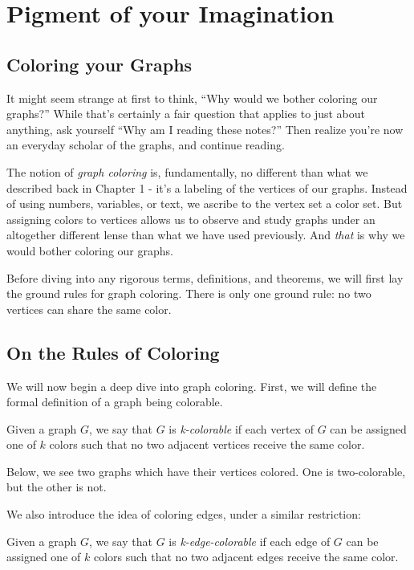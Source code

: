 \chapter{Pigment of your Imagination}
\section{Coloring your Graphs}
It might seem strange at first to think, ``Why would we bother coloring our graphs?'' While that's certainly a fair question that applies to just about anything, ask yourself ``Why am I reading these notes?'' Then realize you're now an everyday scholar of the graphs, and continue reading.

The notion of \textit{graph coloring} is, fundamentally, no different than what we described back in Chapter 1 - it's a labeling of the vertices of our graphs. Instead of using numbers, variables, or text, we ascribe to the vertex set a color set. But assigning colors to vertices allows us to observe and study graphs under an altogether different lense than what we have used previously. And \textit{that} is why we would bother coloring our graphs.

Before diving into any rigorous terms, definitions, and theorems, we will first lay the ground rules for graph coloring. There is only one ground rule: no two vertices can share the same color.

\section{On the Rules of Coloring}
We will now begin a deep dive into graph coloring. First, we will define the formal definition of a graph being colorable.

\begin{definition}[K-Colorable] 
    Given a graph $G$, we say that $G$ is \textit{k-colorable} if each vertex of $G$ can be assigned one of $k$ colors such that no two adjacent vertices receive the same color.
\end{definition}

Below, we see two graphs which have their vertices colored. One is two-colorable, but the other is not.


We also introduce the idea of coloring edges, under a similar restriction:

\begin{definition} 
    Given a graph $G$, we say that $G$ is \textit{k-edge-colorable} if each edge of $G$ can be assigned one of $k$ colors such that no two adjacent edges receive the same color.
\end{definition}


